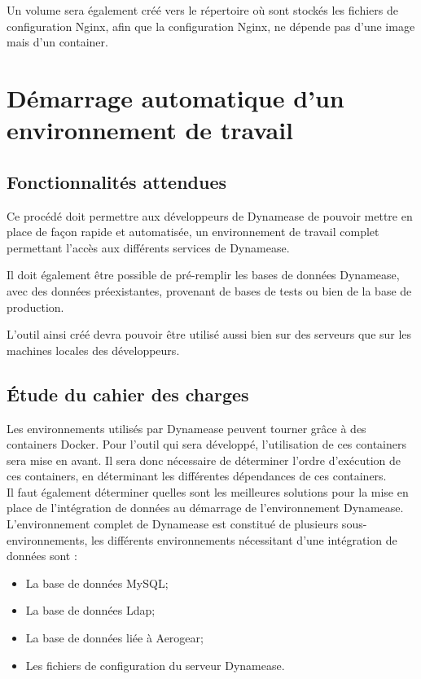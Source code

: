 Un volume sera également créé vers le répertoire où sont stockés les fichiers de configuration Nginx, afin que la configuration Nginx, ne dépende pas d'une image mais d'un container.

\section{Démarrage automatique d'un environnement de travail}

\subsection{Fonctionnalités attendues}

Ce procédé doit permettre aux développeurs de Dynamease de pouvoir mettre en place de façon rapide et automatisée, un environnement de travail complet permettant l'accès aux différents services de Dynamease. 

Il doit également être possible de pré-remplir les bases de données Dynamease, avec des données préexistantes, provenant de bases de tests ou bien de la base de production.

L'outil ainsi créé devra pouvoir être utilisé aussi bien sur des serveurs que sur les machines locales des développeurs. 

\subsection{Étude du cahier des charges}

Les environnements utilisés par Dynamease peuvent tourner grâce à des containers Docker. Pour l'outil qui sera développé, l'utilisation de ces containers sera mise en avant. Il sera donc nécessaire de déterminer l'ordre d'exécution de ces containers, en déterminant les différentes dépendances de ces containers.\\

Il faut également déterminer quelles sont les meilleures solutions pour la mise en place de l'intégration de données au démarrage de l'environnement Dynamease. L'environnement complet de Dynamease est constitué de plusieurs sous-environnements, les différents environnements nécessitant d'une intégration de données sont :

\begin{itemize}
	\item La base de données MySQL;
	\item La base de données Ldap;
	\item La base de données liée à Aerogear;
	\item Les fichiers de configuration du serveur Dynamease.
\end{itemize}

